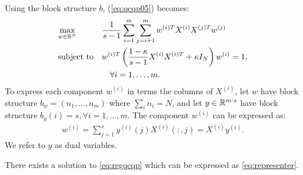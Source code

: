 Using the block structure $b$, (\ref{eq:qcqp05}) becomes:
 \begin{equation}\label{eq:regqcqp}
\begin{aligned}
& \underset{w \in \mathbb{R}^N}{\text{max}}
& & \frac{1}{s -1} \sum_{i = 1}^m \sum_{j = i+1}^m w^{(i)T} X^{(i)}X^{(j)T} w^{(j)} \\
& \text{subject to}
& & w^{(i)T} \left(\frac{1- \kappa}{s - 1}X^{(i)} X^{(i)T} + \kappa  I_N\right) w^{(i)} = 1,\\&&& \quad\forall i = 1,\ldots, m.
\end{aligned}
\end{equation}
To express each component $w^{(i)}$ in terms the columns of $X^{(i)}$,
let $w$ have block structure $b_w = \left(n_1, \ldots, n_m\right)$
where $\sum_i n_i = N$, and let $y \in \mathbb{R}^{m\cdot s}$ have block
structure $b_y\left(i\right) = s, \forall i = 1,\ldots, m$. The
component $w^{(i)}$ can be expressed as:
\begin{equation}\label{eq:representer}
\begin{aligned}
w^{(i)} = \sum_{j = 1}^{s} y^{(i)}\left(j\right) X^{(i)}\left(:,j\right) = X^{(i)} y^{(i)}.
\end{aligned}
\end{equation}
We refer to $y$ as dual variables.
%
%
\begin{lemma}
There exists a solution to \eqref{eq:regqcqp} which can be expressed as \eqref{eq:representer}.
\end{lemma}

